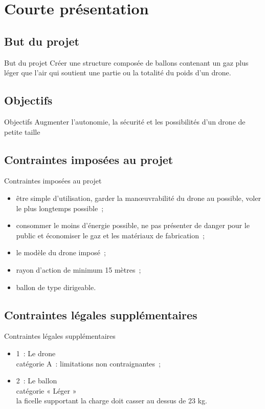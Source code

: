 

\section{Courte présentation}

\subsection{But du projet}
\begin{frame}{But du projet}
 Créer une structure composée de ballons contenant un gaz plus léger que l’air qui soutient une partie ou la totalité du poids d'un drone.
\end{frame}


\subsection{Objectifs}
\begin{frame}{Objectifs}
 Augmenter l’autonomie, la sécurité et les possibilités d’un drone de petite taille
\end{frame}


\subsection{Contraintes imposées au projet}
\begin{frame}{Contraintes imposées au projet}
  \begin{itemize}
    \item être simple d’utilisation, garder la manœuvrabilité du drone au possible, voler le plus longtemps possible~;
    \item consommer le moins d’énergie possible, ne pas présenter de danger pour le public et économiser le gaz et les matériaux de fabrication~;
    \item le modèle du drone imposé~;
    \item rayon d’action de minimum 15 mètres~;
    \item ballon de type dirigeable.
  \end{itemize}
\end{frame}

\subsection{Contraintes légales supplémentaires}
\begin{frame}{Contraintes légales supplémentaires}
  \begin{itemize}
    \item 1~: Le drone \\
	    catégorie A~: limitations non contraignantes~;
    \item 2~: Le ballon \\
	    catégorie « Léger » \\
	    la ficelle supportant la charge doit casser au dessus de 23 kg.
 \end{itemize}
\end{frame}

